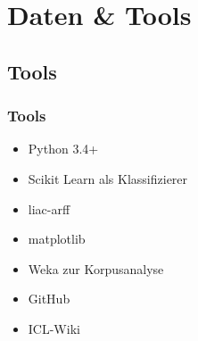 \documentclass{beamer}
\begin{document}
\section{Daten \& Tools}
	\subsection{Tools}
	\begin{frame}
			\frametitle{Tools}
			\begin{itemize}
				\item Python 3.4+
				\item Scikit Learn als Klassifizierer
				\item liac-arff
				\item matplotlib
				\item Weka zur Korpusanalyse
				\item GitHub
				\item ICL-Wiki
			\end{itemize}
	\end{frame}
\end{document}
